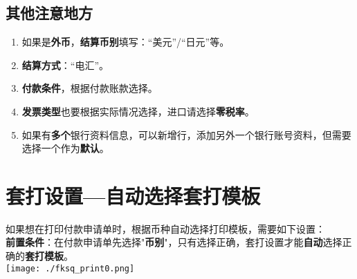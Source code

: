 \documentclass[zihao=-4]{ctexart}
\begin{document}
\hypertarget{ux5176ux4ed6ux6ce8ux610fux5730ux65b9}{%
\subsection{其他注意地方}\label{ux5176ux4ed6ux6ce8ux610fux5730ux65b9}}

\begin{enumerate}
\def\labelenumi{\arabic{enumi}.}
\item
  如果是\textbf{外币}，\textbf{结算币别}填写：“美元”/“日元”等。
\item
  \textbf{结算方式}：“电汇”。
\item
  \textbf{付款条件}，根据付款账款选择。
\item
  \textbf{发票类型}也要根据实际情况选择，进口请选择\textbf{零税率}。
\item
  如果有\textbf{多个}银行资料信息，可以新增行，添加另外一个银行账号资料，但需要选择一个作为\textbf{默认}。
\end{enumerate}

\hypertarget{ux5957ux6253ux8bbeux7f6eux9009ux62e9}{%
\section{套打设置---自动选择套打模板}\label{ux5957ux6253ux8bbeux7f6eux9009ux62e9}}
如果想在打印付款申请单时，根据币种自动选择打印模板，需要如下设置：\\
\textbf{前置条件}：在付款申请单先选择"\textbf{币别}"，只有选择正确，套打设置才能\textbf{自动}选择正确的\textbf{套打模板}。\\
	\texttt{[image: ./fksq\_print0.png]}
\end{document}
